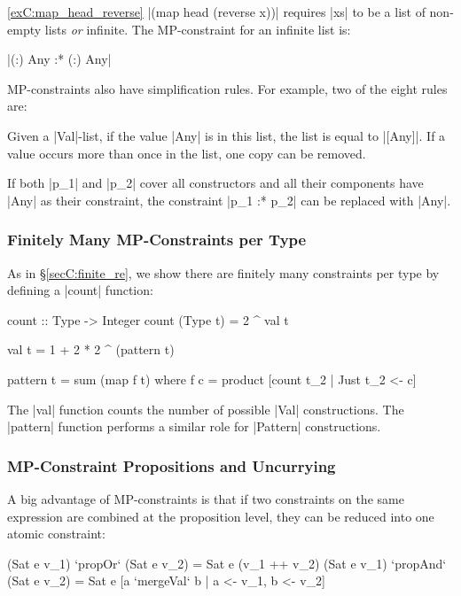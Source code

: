\begin{examplerevisit}{\ref{exC:map_head_reverse}} |(map head (reverse x))| requires |xs| to be a list of non-empty lists \textit{or} infinite. The MP-constraint for an infinite list is: \ignore|{(:) Any} :* {(:) Any}|
\end{examplerevisit}

\bigskip

MP-constraints also have simplification rules.  For example, two of the eight rules are:

 Given a |Val|-list, if the value |Any| is in this list, the list is equal to |[Any]|. If a value occurs more than once in the list, one copy can be removed.

 If both |p_1| and |p_2| cover all constructors and all their components have |Any| as their constraint, the constraint |p_1 :* p_2| can be replaced with |Any|.


\subsubsection{Finitely Many MP-Constraints per Type}

As in \S\ref{secC:finite_re}, we show there are finitely many constraints per type by defining a |count| function:

\begin{code}
count :: Type -> Integer
count (Type t) = 2 ^ val t

val t = 1 + 2 * 2 ^ (pattern t)

pattern t = sum (map f t)
    where f c = product [count t_2 | Just t_2 <- c]
\end{code}

The |val| function counts the number of possible |Val| constructions. The |pattern| function performs a similar role for |Pattern| constructions.


\subsubsection{MP-Constraint Propositions and Uncurrying}

A big advantage of MP-constraints is that if two constraints on the same expression are combined at the proposition level, they can be reduced into one atomic constraint:

\ignore\begin{code}
(Sat e v_1)  `propOr`   (Sat e v_2) = Sat e (v_1 ++ v_2)
(Sat e v_1)  `propAnd`  (Sat e v_2) = Sat e [a `mergeVal` b | a <- v_1, b <- v_2]
\end{code}

